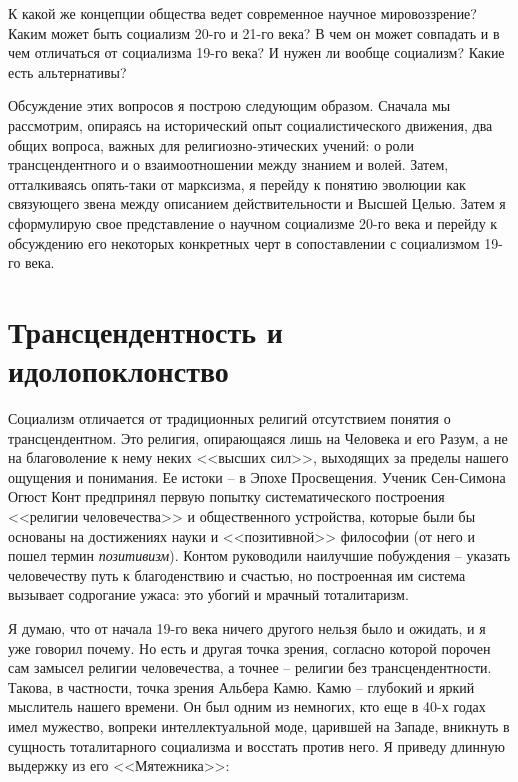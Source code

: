 \documentclass{book}
\begin{document}
К какой же концепции общества ведет современное научное мировоззрение? Каким может быть социализм 20-го и 21-го века? В чем он может совпадать и в чем отличаться от социализ­ма 19-го века? И нужен ли вообще социализм? Какие есть аль­тернативы?

Обсуждение этих вопросов я построю следующим образом. Сначала мы рассмотрим, опираясь на исторический опыт социалистического движения, два общих вопроса, важных для религиозно-этических учений: о роли трансцендентного и о взаимоотношении между знанием и волей. Затем, отталкиваясь опять-таки от марксизма, я перейду к понятию эволюции как связующего звена между описанием действительности и Высшей Целью. Затем я сформулирую свое представление о научном социализме 20-го века и перейду к обсуждению его некоторых конкретных черт в сопоставлении с социализмом 19-го века.



\section{Трансцендентность и идолопоклонство}

Социализм отличается от традиционных религий отсутствием понятия о трансцендентном. Это религия, опирающаяся лишь на Человека и его Разум, а не на благоволение к нему неких <<высших сил>>, выходящих за пределы нашего ощущения и понимания. Ее истоки -- в Эпохе Просвещения. Ученик Сен-Симона Огюст Конт предпринял первую попытку системати­ческого построения <<религии человечества>> и общественного устройства, которые были бы основаны на достижениях науки и <<позитивной>> философии (от него и пошел термин \textit{позитивизм}).  Контом руководили наилучшие побуждения -- указать человечеству путь к благоденствию и счастью, но построенная им система вызывает содрогание ужаса: это убогий и мрачный тоталитаризм.

Я думаю, что от начала 19-го века ничего другого нельзя было и ожидать, и я уже говорил почему. Но есть и другая точка зрения, согласно которой порочен сам замысел религии человечества, а точнее -- религии без трансцендентности. Такова, в частности, точка зрения Альбера Камю. Камю -- глубокий и яркий мыслитель нашего времени. Он был одним из немногих, кто еще в 40-х годах имел мужество, вопреки интеллектуальной моде, царившей на Западе, вникнуть в сущность тоталитарного социализма и восстать против него. Я приведу длинную выдержку из его <<Мятежника>>:
\end{document}
